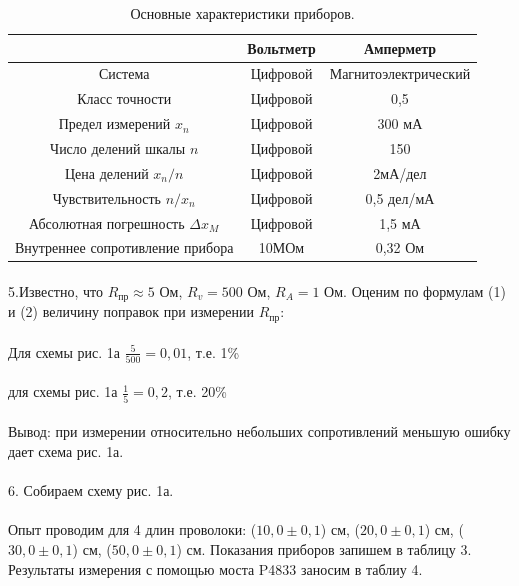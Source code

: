 \documentclass[14pt, a4paper]{scrartcl}
\begin{document}
\begin{table}[H]
\caption{\label{tab:charast}Основные характеристики приборов.}
\begin{center}
\begin{tabular}{|c|c|c|}
\hline
& Вольтметр & Амперметр \\
\hline
Система&Цифровой&Магнитоэлектрический\\
Класс точности&Цифровой&0,5\\
Предел измерений $x_n$& Цифровой & 300 мА\\
Число делений шкалы $n$& Цифровой & 150\\
Цена делений $x_n/n$& Цифровой & 2мА/дел\\
Чувствительность $n/x_n$& Цифровой & 0,5 дел/мА\\
Абсолютная погрешность $\Delta x_M$ & Цифровой & 1,5 мА\\
Внутреннее сопротивление прибора & 10МОм & 0,32 Ом\\
\hline
\end{tabular}
\end{center}
\end{table} 

\paragraph{}
5.Известно, что $R_\text{пр}\approx 5$ Ом, $R_v=500$ Ом, $R_A = 1$ Ом. Оценим по формулам (1) и (2) величину поправок при измерении $R_\text{пр}$:
\paragraph{}
Для схемы рис. 1а $\frac{5}{500}=0,01$, т.е. 1\%
\paragraph{}
для схемы рис. 1а $\frac{1}{5}=0,2$, т.е. 20\%
\paragraph{}
Вывод: при измерении относительно небольших сопротивлений меньшую ошибку дает схема рис. 1а.
\paragraph{}
6. Собираем схему рис. 1а.
\paragraph{}
Опыт проводим для 4 длин проволоки: ($10,0\pm0,1$) см, ($20,0\pm0,1$) см, ($30,0\pm0,1$) см, ($50,0\pm0,1$) см. Показания приборов запишем в таблицу 3. Результаты измерения с помощью моста P4833 заносим в таблиу 4.
\end{document}
